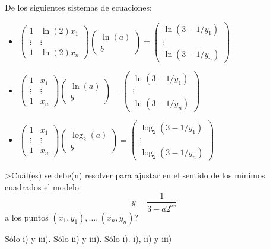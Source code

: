 \begin{pregunta}
\begin{cuerpo}
De los siguientes sistemas de ecuaciones:
\begin{itemize}
\item[i)]
$
\left(
\begin{array}{cc}
1&\ln(2)x_1\\
\vdots&\vdots\\
1&\ln(2)x_n
\end{array}
\right)
\left(
\begin{array}{c}
\ln(a)\\
b
\end{array}
\right)=
\left(
\begin{array}{c}
\ln(3-1/y_1)\\
\vdots\\
\ln(3-1/y_n)
\end{array}
\right)
$
\item[ii)]
$
\left(
\begin{array}{cc}
1&x_1\\
\vdots&\vdots\\
1&x_n
\end{array}
\right)
\left(
\begin{array}{c}
\ln(a)\\
b
\end{array}
\right)=
\left(
\begin{array}{c}
\ln(3-1/y_1)\\
\vdots\\
\ln(3-1/y_n)
\end{array}
\right)
$
\item[iii)]
$
\left(
\begin{array}{cc}
1&x_1\\
\vdots&\vdots\\
1&x_n
\end{array}
\right)
\left(
\begin{array}{c}
\log_2(a)\\
b
\end{array}
\right)=
\left(
\begin{array}{c}
\log_2(3-1/y_1)\\
\vdots\\
\log_2(3-1/y_n)
\end{array}
\right)
$
\end{itemize}
>Cu\'al(es)  se debe(n) resolver para ajustar en el sentido de los m\'inimos cuadrados el modelo
$$
y=\dfrac{1}{3-a2^{bx}}
$$
a los puntos $(x_1,y_1),\ldots,(x_n,y_n)$?

\end{cuerpo}
\begin{multicols}{2}
\begin{alternativas}
{S\'olo i) y iii).}
{S\'olo ii) y iii).}
{S\'olo i).}
{i), ii) y iii)}
\end{alternativas}
\end{multicols}
\justificacion{7cm}
\end{pregunta}